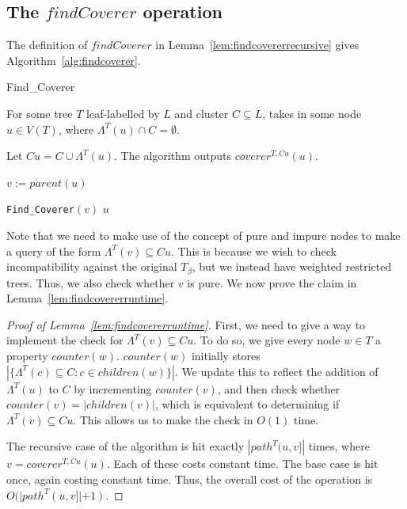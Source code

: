 \documentclass[12pt,a4paper]{article}
\newcommand{\leafset}{\Lambda}
\newcommand{\TB}{T_\beta}
\begin{document}
    \subsection{The $findCoverer$ operation}
    \label{subsec:findcoverer}

    The definition of $findCoverer$ in Lemma~\ref{lem:findcovererrecursive} gives Algorithm~\ref{alg:findcoverer}.

    \begin{algorithm}
        \caption{Find\_Coverer}
        \label{alg:findcoverer}

        \begin{algorithmic}[1]
            \Input For some tree $T$ leaf-labelled by $L$ and cluster $C \subseteq L$, takes in some node $u \in V(T)$, where $\leafset^{T}(u) \cap C = \emptyset$.

            \Output Let $Cu = C \cup \leafset^{T}(u)$. The algorithm outputs $coverer^{T, Cu}(u)$.

            \State $v := parent(u)$

            \If{$\leafset^{T}(v) \subseteq Cu$ and $v$ is pure}
                \State \Return \texttt{Find\_Coverer}$(v)$
            \Else
                \State \Return $u$
            \EndIf
        \end{algorithmic}
    \end{algorithm}

    Note that we need to make use of the concept of pure and impure nodes to make a query of the form $\leafset^{T}(v) \subseteq Cu$. This is because we wish to check incompatibility against the original $\TB$, but we instead have weighted restricted trees. Thus, we also check whether $v$ is pure. We now prove the claim in Lemma~\ref{lem:findcovererruntime}.

    \begin{proof}[Proof of Lemma~\ref{lem:findcovererruntime}]
        First, we need to give a way to implement the check for $\leafset^{T}(v) \subseteq Cu$. To do so, we give every node $w \in T$ a property $counter(w)$. $counter(w)$ initially stores $|\{\leafset^{T}(c) \subseteq C : c \in children(w)\}|$. We update this to reflect the addition of $\leafset^{T}(u)$ to $C$ by incrementing $counter(v)$, and then check whether $counter(v) = |children(v)|$, which is equivalent to determining if $\leafset^{T}(v) \subseteq Cu$. This allows us to make the check in $O(1)$ time.

        The recursive case of the algorithm is hit exactly $|path^{T}(u, v]|$ times, where $v = coverer^{T, Cu}(u)$. Each of these costs constant time. The base case is hit once, again costing constant time. Thus, the overall cost of the operation is $O(|path^{T}(u, v]| + 1)$.
    \end{proof}
\end{document}
